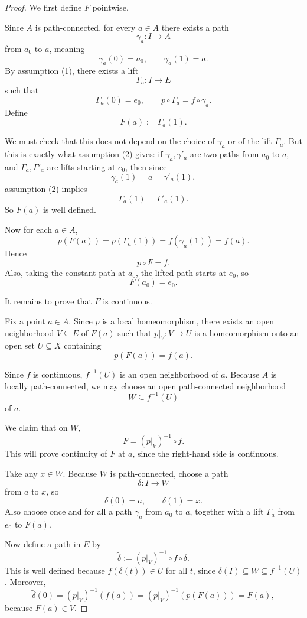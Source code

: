 \documentclass{article}
\begin{document}
\begin{proof}
We first define \(F\) pointwise.

Since \(A\) is path-connected, for every \(a\in A\) there exists a path
\[
\gamma_a:I\to A
\]
from \(a_0\) to \(a\), meaning
\[
\gamma_a(0)=a_0,\qquad \gamma_a(1)=a.
\]
By assumption (1), there exists a lift
\[
\Gamma_a:I\to E
\]
such that
\[
\Gamma_a(0)=e_0,\qquad p\circ \Gamma_a=f\circ \gamma_a.
\]
Define
\[
F(a):=\Gamma_a(1).
\]

We must check that this does not depend on the choice of \(\gamma_a\) or of the lift \(\Gamma_a\). But this is exactly what assumption (2) gives: if \(\gamma_a,\gamma'_a\) are two paths from \(a_0\) to \(a\), and \(\Gamma_a,\Gamma'_a\) are lifts starting at \(e_0\), then since
\[
\gamma_a(1)=a=\gamma'_a(1),
\]
assumption (2) implies
\[
\Gamma_a(1)=\Gamma'_a(1).
\]
So \(F(a)\) is well defined.

Now for each \(a\in A\),
\[
p(F(a))=p(\Gamma_a(1))=f(\gamma_a(1))=f(a).
\]
Hence
\[
p\circ F=f.
\]
Also, taking the constant path at \(a_0\), the lifted path starts at \(e_0\), so
\[
F(a_0)=e_0.
\]

It remains to prove that \(F\) is continuous.

Fix a point \(a\in A\). Since \(p\) is a local homeomorphism, there exists an open neighborhood \(V\subseteq E\) of \(F(a)\) such that \(p|_V:V\to U\) is a homeomorphism onto an open set \(U\subseteq X\) containing
\[
p(F(a))=f(a).
\]

Since \(f\) is continuous, \(f^{-1}(U)\) is an open neighborhood of \(a\). Because \(A\) is locally path-connected, we may choose an open path-connected neighborhood
\[
W\subseteq f^{-1}(U)
\]
of \(a\).

We claim that on \(W\),
\[
F=(p|_V)^{-1}\circ f.
\]
This will prove continuity of \(F\) at \(a\), since the right-hand side is continuous.

Take any \(x\in W\). Because \(W\) is path-connected, choose a path
\[
\delta:I\to W
\]
from \(a\) to \(x\), so
\[
\delta(0)=a,\qquad \delta(1)=x.
\]
Also choose once and for all a path \(\gamma_a\) from \(a_0\) to \(a\), together with a lift \(\Gamma_a\) from \(e_0\) to \(F(a)\).

Now define a path in \(E\) by
\[
\widetilde\delta := (p|_V)^{-1}\circ f\circ \delta.
\]
This is well defined because \(f(\delta(t))\in U\) for all \(t\), since \(\delta(I)\subseteq W\subseteq f^{-1}(U)\). Moreover,
\[
\widetilde\delta(0)=(p|_V)^{-1}(f(a))=(p|_V)^{-1}(p(F(a)))=F(a),
\]
because \(F(a)\in V\).


\end{proof}
\end{document}
